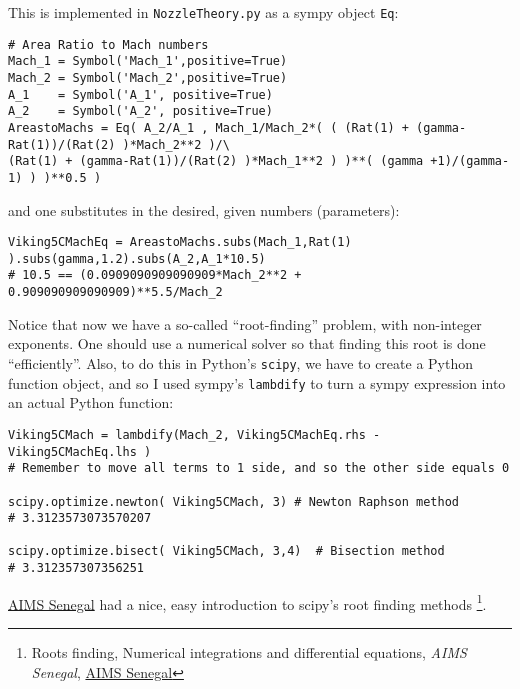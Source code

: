 \documentclass[10pt]{amsart}
\begin{document}
\begin{multicols*}{2}
\begin{enumerate}
This is implemented in \verb|NozzleTheory.py| as a sympy object \verb|Eq|:
\begin{lstlisting}
# Area Ratio to Mach numbers
Mach_1 = Symbol('Mach_1',positive=True)
Mach_2 = Symbol('Mach_2',positive=True)
A_1    = Symbol('A_1', positive=True)
A_2    = Symbol('A_2', positive=True)
AreastoMachs = Eq( A_2/A_1 , Mach_1/Mach_2*( ( (Rat(1) + (gamma-Rat(1))/(Rat(2) )*Mach_2**2 )/\
(Rat(1) + (gamma-Rat(1))/(Rat(2) )*Mach_1**2 ) )**( (gamma +1)/(gamma-1) ) )**0.5 )
\end{lstlisting}
and one substitutes in the desired, given numbers (parameters):
\begin{lstlisting}
Viking5CMachEq = AreastoMachs.subs(Mach_1,Rat(1) ).subs(gamma,1.2).subs(A_2,A_1*10.5)
# 10.5 == (0.0909090909090909*Mach_2**2 + 0.909090909090909)**5.5/Mach_2
\end{lstlisting}
Notice that now we have a so-called ``root-finding'' problem, with non-integer exponents.  One should use a numerical solver so that finding this root is done ``efficiently''.  Also, to do this in Python's \verb|scipy|, we have to create a Python function object, and so I used sympy's \verb|lambdify| to turn a sympy expression into an actual Python function:
\begin{lstlisting}
Viking5CMach = lambdify(Mach_2, Viking5CMachEq.rhs - Viking5CMachEq.lhs ) 
# Remember to move all terms to 1 side, and so the other side equals 0

scipy.optimize.newton( Viking5CMach, 3) # Newton Raphson method
# 3.3123573073570207

scipy.optimize.bisect( Viking5CMach, 3,4)  # Bisection method
# 3.312357307356251
\end{lstlisting}
\href{https://sites.google.com/a/aims-senegal.org/scipy/roots-finding-numerical-integrations-and-differential-equations}{AIMS Senegal} had a nice, easy introduction to scipy's root finding methods \footnote{Roots finding, Numerical integrations and differential equations, \emph{AIMS Senegal}, \href{https://sites.google.com/a/aims-senegal.org/scipy/roots-finding-numerical-integrations-and-differential-equations}{AIMS Senegal}}.  


\end{enumerate}
\end{multicols*}
\end{document}
